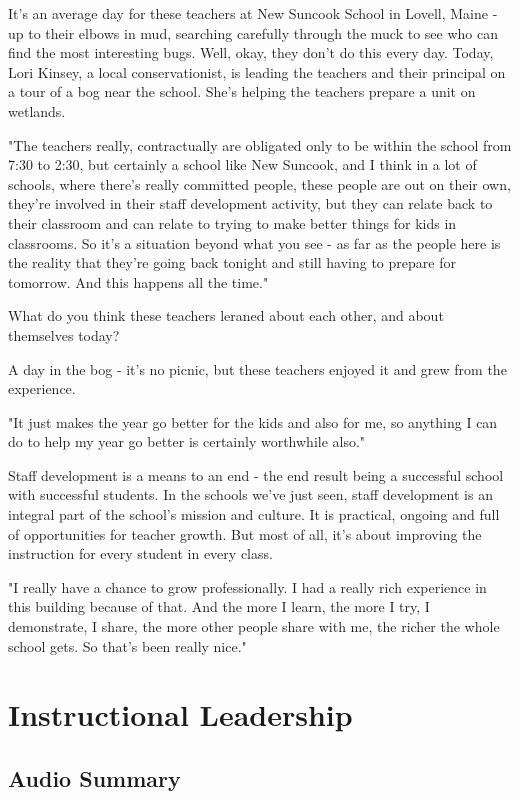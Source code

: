 It's an average day for these teachers at New Suncook School in Lovell, Maine - up to their elbows in mud, searching carefully through the muck to see who can find the most interesting bugs. Well, okay, they don't do this every day. Today, Lori Kinsey, a local conservationist, is leading the teachers and their principal on a tour of a bog near the school. She's helping the teachers prepare a unit on wetlands.

"The teachers really, contractually are obligated only to be within the school from 7:30 to 2:30, but certainly a school like New Suncook, and I think in a lot of schools, where there's really committed people, these people are out on their own, they're involved in their staff development activity, but they can relate back to their classroom and can relate to trying to make better things for kids in classrooms. So it's a situation beyond what you see - as far as the people here is the reality that they're going back tonight and still having to prepare for tomorrow. And this happens all the time."

What do you think these teachers leraned about each other, and about themselves today?

A day in the bog - it's no picnic, but these teachers enjoyed it and grew from the experience.

"It just makes the year go better for the kids and also for me, so anything I can do to help my year go better is certainly worthwhile also."

Staff development is a means to an end - the end result being a successful school with successful students. In the schools we've just seen, staff development is an integral part of the school's mission and culture. It is practical, ongoing and full of opportunities for teacher growth. But most of all, it's about improving the instruction for every student in every class.

"I really have a chance to grow professionally. I had a really rich experience in this building because of that. And the more I learn, the more I try, I demonstrate, I share, the more other people share with me, the richer the whole school gets. So that's been really nice."

\section{Instructional Leadership}

\subsection{Audio Summary}

